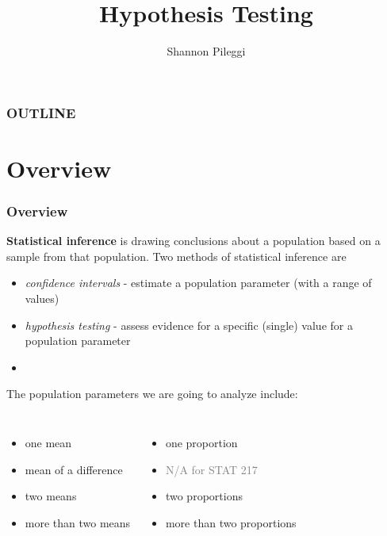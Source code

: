 





\title[Unit 2 Deck 3]{Hypothesis Testing}
\author[Pileggi]{Shannon Pileggi}


\date{}




\begin{frame}
\titlepage
\end{frame}

\begin{frame}
\frametitle{OUTLINE\qquad\qquad\qquad} \tableofcontents[hideallsubsections]
\end{frame}


\section[Overview]{Overview}

\begin{frame}
\frametitle{Overview}
\textbf{Statistical inference} is drawing conclusions about a population based on a sample from that population.  Two methods of statistical inference are
\begin{itemize}
\item \emph{confidence intervals} - estimate a population parameter (with a range of values)
\item \emph{hypothesis testing} - assess evidence for a specific (single) value for a population parameter
\item[]
\end{itemize}
The population parameters we are going to analyze include:
\begin{columns}
\begin{itemize}
    \item
    one mean
    \item
    mean of a difference
    \item
    two means
    \item
    more than two means
\end{itemize}
\begin{itemize}
    \item
    one proportion
    \item
    \textcolor{gray}{N/A for STAT 217}
    \item
    two proportions
    \item
    more than two proportions
\end{itemize}
\end{columns}
\end{frame}

